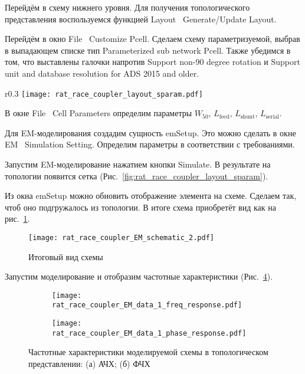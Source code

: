 Перейдём в схему нижнего уровня. Для получения топологического представления воспользуемся функцией Layout \textrightarrow\ Generate/Update Layout.

Перейдём в окно File \textrightarrow\ Customize Pcell.
Сделаем схему параметризуемой, выбрав в выпадающем списке тип Parameterized sub network Pcell.
Также убедимся в том, что выставлены галочки напротив Support non-90 degree rotation и Support unit and database resolution for ADS 2015 and older.

\begin{wrapfigure}{r}{0.3\textwidth}
    \centering
    \texttt{[image: rat\_race\_coupler\_layout\_sparam.pdf]}
    \caption{Топологическое представление после проведения EM-моделирования}%
    \label{fig:rat_race_coupler_layout_sparam}
\end{wrapfigure}

В окне File \textrightarrow\ Cell Parameters определим параметры $W_{50}$, $L_\text{feed}$, $L_\text{shunt}$, $L_\text{serial}$.

Для EM-моделирования создадим сущность emSetup.
Это можно сделать в окне EM \textrightarrow\ Simulation Setting.
Определим параметры в соответствии с требованиями.

Запустим EM-моделирование нажатием кнопки Simulate.
В результате на топологии появится сетка (Рис.~\ref{fig:rat_race_coupler_layout_sparam}).

Из окна emSetup можно обновить отображение элемента на схеме.
Сделаем так, чтоб оно подгружалось из топологии.
В итоге схема приобретёт вид как на рис.~\ref{fig:rat_race_coupler_EM_schematic_2}.

\begin{figure}[!ht]
    \centering
    \texttt{[image: rat\_race\_coupler\_EM\_schematic\_2.pdf]}
    \caption{Итоговый вид схемы}%
    \label{fig:rat_race_coupler_EM_schematic_2}
\end{figure}

Запустим моделирование и отобразим частотные характеристики (Рис.~\ref{fig:rat_race_coupler_EM_data_1}).

\begin{figure}[!ht]
    \centering
    \begin{subfigure}[b]{0.45\textwidth}
        \centering
        \texttt{[image: rat\_race\_coupler\_EM\_data\_1\_freq\_response.pdf]}
        \caption{}%
    \label{fig:rat_race_coupler_EM_data_1_freq_response}
    \end{subfigure}
    \hfill
    \begin{subfigure}[b]{0.45\textwidth}
        \centering
        \texttt{[image: rat\_race\_coupler\_EM\_data\_1\_phase\_response.pdf]}
        \caption{}%
    \label{fig:rat_race_coupler_EM_data_1_phase_response}
    \end{subfigure}
    \caption{%
        Частотные характеристики моделируемой схемы в топологическом представлении:
        (а) АЧХ;
        (б) ФЧХ
    }%
    \label{fig:rat_race_coupler_EM_data_1}
\end{figure}
